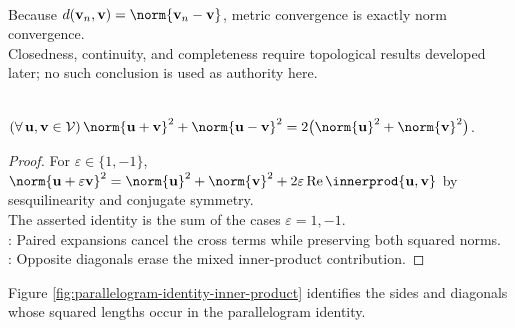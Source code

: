 \begin{perspective} \label{per:inner-product-metric-topology-finite-dimensional} \\
Because $d(\mathbf{v}_n,\mathbf{v})=\norm{\mathbf{v}_n-\mathbf{v}}$, metric convergence is exactly norm convergence.\\
Closedness, continuity, and completeness require topological results developed later; no such conclusion is used as authority here.
\end{perspective}

\begin{theorem} \label{thm:parallelogram-identity-inner-product} \\
$(\forall\,\mathbf{u},\mathbf{v}\in\mathcal{V})\,\norm{\mathbf{u}+\mathbf{v}}^2+\norm{\mathbf{u}-\mathbf{v}}^2=2\bigl(\norm{\mathbf{u}}^2+\norm{\mathbf{v}}^2\bigr)$.
\begin{proof}
For $\varepsilon\in\{1,-1\}$, $\norm{\mathbf{u}+\varepsilon\mathbf{v}}^2=\norm{\mathbf{u}}^2+\norm{\mathbf{v}}^2+2\varepsilon\operatorname{Re}\innerprod{\mathbf{u},\mathbf{v}}$ by sesquilinearity and conjugate symmetry.\\
The asserted identity is the sum of the cases $\varepsilon=1,-1$.\\
: Paired expansions cancel the cross terms while preserving both squared norms.\\
: Opposite diagonals erase the mixed inner-product contribution.
\end{proof}
\end{theorem}

\begin{illustrationfigure}[H]
  \centering
  
  \caption{A parallelogram with side vectors $\mathbf{u},\mathbf{v}$ and diagonal vectors $\mathbf{u}+\mathbf{v},\mathbf{u}-\mathbf{v}$.}
  \label{fig:parallelogram-identity-inner-product}
\end{illustrationfigure}

Figure \ref{fig:parallelogram-identity-inner-product} identifies the sides and diagonals whose squared lengths occur in the parallelogram identity.

